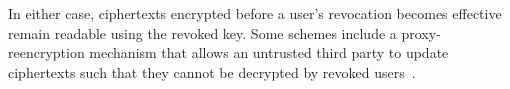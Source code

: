 In either case, ciphertexts encrypted before a user's revocation becomes effective remain readable using the revoked key.
Some schemes include a proxy-reencryption mechanism that allows an untrusted third party to update ciphertexts such that they cannot be decrypted by revoked users~\cite{manna_sea-brew_2021}.








